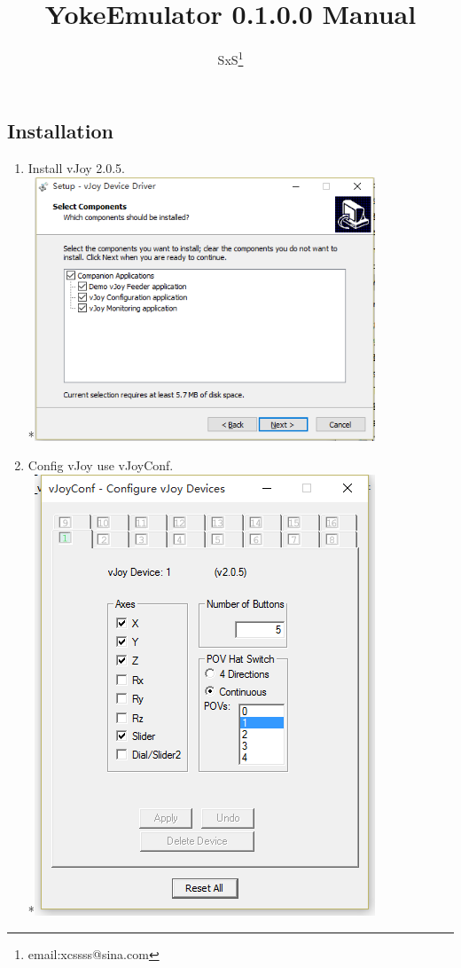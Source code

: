 \documentclass[12pt,a4paper]{article}
\title{YokeEmulator 0.1.0.0 Manual}
\author{SxS\footnote{email:xcssss@sina.com}}
\begin{document}
\begin{CJK}{UTF8}{gbsn}
\maketitle

\section{Installation}
\begin{enumerate}
\item Install vJoy 2.0.5.
\\*\includegraphics[width=4in]{install_vjoy.png}
\item Config vJoy use vJoyConf.
\\*\includegraphics[width=4in]{install_config_vjoy.png}

\end{enumerate}
\end{CJK}
\end{document}
